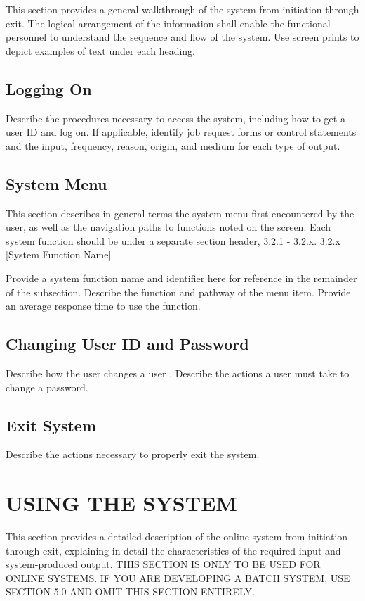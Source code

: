 \documentclass[10pt,letterpaper,extrafontsizes]{memoir}
\begin{document}
This section provides a general walkthrough of the system from initiation through exit.  The logical arrangement of the information shall enable the functional personnel to understand the sequence and flow of the system.  Use screen prints to depict examples of text under each heading.
\section{Logging On}

Describe the procedures necessary to access the system, including how to get a user ID and log on.  If applicable, identify job request forms or control statements and the input, frequency, reason, origin, and medium for each type of output.
\section{System Menu}

This section describes in general terms the system menu first encountered by the user, as well as the navigation paths to functions noted on the screen.  Each system function should be under a separate section header, 3.2.1 - 3.2.x.
3.2.x	[System Function Name]

Provide a system function name and identifier here for reference in the remainder of the subsection.  Describe the function and pathway of the menu item.  Provide an average response time to use the function.
\section{Changing User ID and Password}

Describe how the user changes a user .  Describe the actions a user must take to change a password.
\section{Exit System}

Describe the actions necessary to properly exit the system. 


\chapter{USING THE SYSTEM}

This section provides a detailed description of the online system from initiation through exit, explaining in detail the characteristics of the required input and system-produced output.  THIS SECTION IS ONLY TO BE USED FOR ONLINE SYSTEMS.  IF YOU ARE DEVELOPING A BATCH SYSTEM, USE SECTION 5.0 AND OMIT THIS SECTION ENTIRELY.
\end{document}
